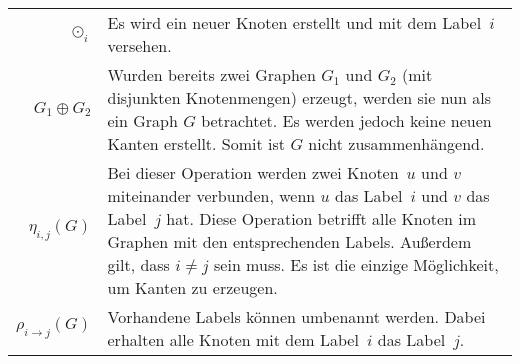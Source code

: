 \begin{longtable}{r>{\raggedright\arraybackslash}X@{}}
    $\odot_i$ & Es wird ein neuer Knoten erstellt und mit dem Label~$i$ versehen.\par
\\    
    $G_1 \oplus G_2$ & Wurden bereits zwei Graphen $G_1$ und $G_2$ (mit disjunkten Knotenmengen) erzeugt, werden sie nun als ein Graph $G$ betrachtet. Es werden jedoch keine neuen Kanten erstellt. Somit ist $G$ nicht zusammenhängend.\par
\\
    $\eta_{i,j}(G)$ & Bei dieser Operation werden zwei Knoten~$u$ und $v$ miteinander verbunden, wenn $u$ das Label~$i$ und $v$ das Label~$j$ hat. Diese Operation betrifft alle Knoten im Graphen mit den entsprechenden Labels. Außerdem gilt, dass $i \neq j$ sein muss. Es ist die einzige Möglichkeit, um Kanten zu erzeugen.\par
\\    
    $\rho_{i \rightarrow j}(G)$ & Vorhandene Labels können umbenannt werden. Dabei erhalten alle Knoten mit dem Label~$i$ das Label~$j$. %
\end{longtable}